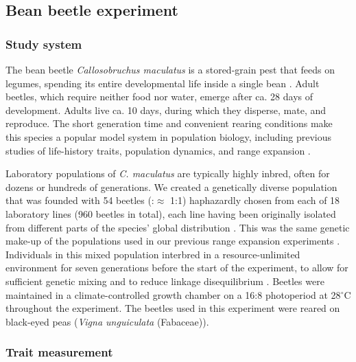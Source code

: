 \documentclass[11pt]{article}
\begin{document}
\subsection*{Bean beetle experiment}

\subsubsection*{Study system}

The bean beetle \textit{Callosobruchus maculatus} is a stored-grain pest that feeds on legumes, spending its entire developmental life inside a single bean \citep{fujii_behavioral_1990}.
Adult beetles, which require neither food nor water, emerge after ca. 28 days of development.
Adults live ca. 10 days, during which they disperse, mate, and reproduce.
The short generation time and convenient rearing conditions make this species a popular model system in population biology, including previous studies of life-history traits, population dynamics, and range expansion \citep{bellows_analytical_1982,fujii_behavioral_1990,miller_confronting_2011,miller_sex_2013,wagner2017genetic,ochocki_rapid_2017}.

Laboratory populations of \textit{C. maculatus} are typically highly inbred, often for dozens or hundreds of generations.
We created a genetically diverse population that was founded with 54 beetles (\female:\mars $\approx$ 1:1) haphazardly chosen from each of 18 laboratory lines (960 beetles in total), each line having been originally isolated from different parts of the species’ global distribution \citep{downey_comparative_2015}.
This was the same genetic make-up of the populations used in our previous range expansion experiments \citep{ochocki_rapid_2017}.
Individuals in this mixed population interbred in a resource-unlimited environment for seven generations before the start of the experiment, to allow for sufficient genetic mixing and to reduce linkage disequilibrium \citep{roughgarden_theory_1979,ochocki_rapid_2017}.
Beetles were maintained in a climate-controlled growth chamber on a 16:8 photoperiod at 28$^{\circ}$C throughout the experiment.
The beetles used in this experiment were reared on black-eyed peas (\textit{Vigna unguiculata} (Fabaceae)). 

\subsubsection*{Trait measurement}
\end{document}
